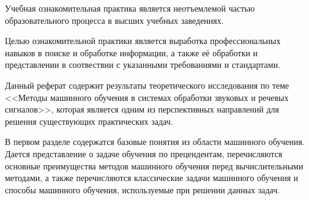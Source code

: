 









Учебная ознакомительная практика является неотъемлемой частью образовательного 
процесса в высших учебных заведениях.

Целью ознакомительной практики является выработка профессиональных навыков
в поиске и обработке информации, а также её обработки и представлении
в соотвествии с указанными требованиями и стандартами.

Данный реферат содержит результаты теоретического исследования по теме
<<Методы машинного обучения в системах обработки звуковых и речевых сигналов>>,
которая является одним из перспективных направлений для решения 
существующих практических задач.

В первом разделе содержатся базовые понятия из области машинного обучения.
Дается представление о задаче обучения по прецендентам, перечисляются основные преимущества
методов машинного обучения перед вычислительными методами, а также перечисляются классические задачи машинного 
обучения и способы машинного обучения, используемые при решении данных задач.

